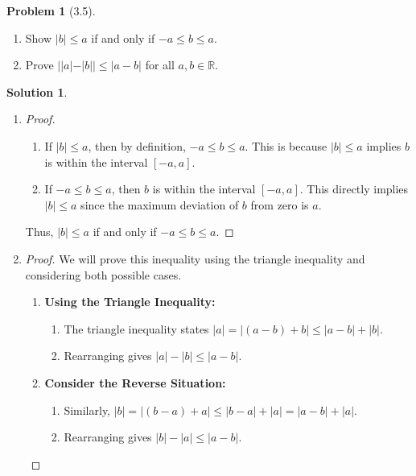 \documentclass[12pt]{article}
\theoremstyle{definition} %
\newtheorem{solution}{Solution}
\newtheorem{problem}{Problem}
\theoremstyle{plain} %
\begin{document}
\begin{problem}[3.5]
    \begin{enumerate}
        \item Show $|b|\leq a$ if and only if $-a\leq b\leq a$.
        \item Prove $||a|-|b||\leq|a-b|$ for all $a,b \in \mathbb{R}$.
    \end{enumerate}
\end{problem}

\begin{solution}
   \begin{enumerate}
    \item \begin{proof}
        \begin{enumerate}
            \item If $|b| \leq a$, then by definition, $-a \leq b \leq a$. This is because $|b| \leq a$ implies $b$ is within the interval $[-a, a]$.
            \item If $-a \leq b \leq a$, then $b$ is within the interval $[-a, a]$. This directly implies $|b| \leq a$ since the maximum deviation of $b$ from zero is $a$.
        \end{enumerate}
        Thus, $|b| \leq a$ if and only if $-a \leq b \leq a$. 
    \end{proof}
    \item \begin{proof}
        We will prove this inequality using the triangle inequality and considering both possible cases.
        \begin{enumerate}
            \item \textbf{Using the Triangle Inequality:}
            \begin{enumerate}
                \item The triangle inequality states $|a| = |(a - b) + b| \leq |a - b| + |b|$.
                \item Rearranging gives $|a| - |b| \leq |a - b|$.
            \end{enumerate}
            
            \item \textbf{Consider the Reverse Situation:}
            \begin{enumerate}
                \item Similarly, $|b| = |(b - a) + a| \leq |b - a| + |a| = |a - b| + |a|$.
                \item Rearranging gives $|b| - |a| \leq |a - b|$.
            \end{enumerate}
            

\end{enumerate}
\end{proof}
\end{enumerate}
\end{solution}
\end{document}
